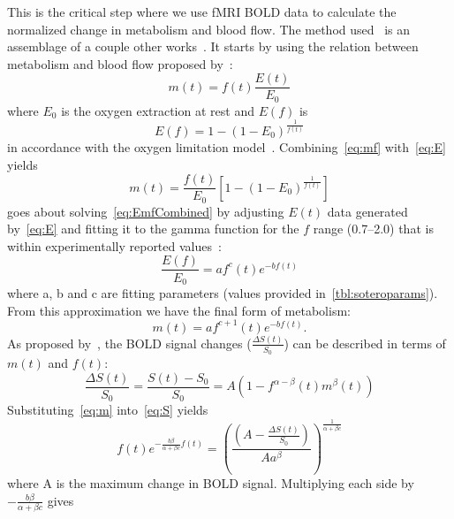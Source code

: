     This is the critical step where we use fMRI BOLD data to calculate the normalized change in metabolism and blood flow.  The method used~\citep{sotero2011} is an assemblage of a couple other works~\citep{buxton2004,buxton1997,fox1988,leithner2009,lin2010,davis1998}. It starts by using the relation between metabolism and blood flow proposed by~\citet{buxton2004}:
    \begin{equation} \label{eq:mf}
      m(t)=f(t)\frac{E(t)}{E_0}
    \end{equation}
  where $E_0$ is the oxygen extraction at rest and $E(f)$ is
    \begin{equation} \label{eq:E}
      E(f)=1-(1-E_0)^{\frac{1}{f(t)}}
    \end{equation}
  in accordance with the oxygen limitation model~\citep{buxton1997}.  Combining~\cref{eq:mf} with~\cref{eq:E} yields
    \begin{equation} \label{eq:EmfCombined}
      m(t)=\frac{f(t)}{E_0}\left[1-(1-E_0)^{\frac{1}{f(t)}}\right]
    \end{equation}
   goes about solving~\cref{eq:EmfCombined} by adjusting $E(t)$ data generated by~\cref{eq:E} and fitting it to the gamma function for the $f$ range (0.7--2.0) that is within experimentally reported values~\citep{fox1988,leithner2009,lin2010}:
    \begin{equation} \label{eq:gammafct}
      \frac{E(f)}{E_0}=af^{c}(t)e^{-bf(t)}
    \end{equation}
  where a, b and c are fitting parameters (values provided in~\cref{tbl:soteroparams}).  From this approximation we have the final form of metabolism:
    \begin{equation} \label{eq:m} 
      m(t)=af^{c+1}(t)e^{-bf(t)}.
    \end{equation}
  As proposed by~\citet{davis1998}, the BOLD signal changes ($\frac{\Delta S(t)}{S_0}$) can be described in terms of $m(t)$ and $f(t)$:
    \begin{equation} \label{eq:S}
      \frac{\Delta S(t)}{S_0} = \frac{S(t)-S_0}{S_0} = A(1-f^{\alpha-\beta}(t) m^\beta(t))
    \end{equation}
  Substituting~\cref{eq:m} into~\cref{eq:S} yields
    \begin{equation} \label{eq:mAndS}
      f(t)e^{-\frac{b \beta}{\alpha + \beta c}f(t)}=\left(\frac{\left(A-\frac{\Delta S(t)}{S_0}\right)}{A a^\beta}\right)^{\frac{1}{\alpha+\beta c}}
    \end{equation}
  where A is the maximum change in BOLD signal.  Multiplying each side by $-\frac{b\beta}{\alpha+\beta c}$ gives
